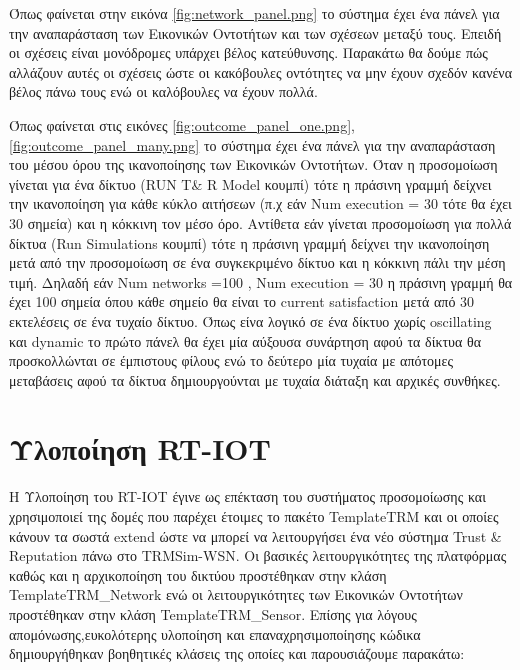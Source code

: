 Όπως φαίνεται στην εικόνα \ref{fig:network_panel.png} το σύστημα έχει ένα πάνελ για την αναπαράσταση των Εικονικών Οντοτήτων και των σχέσεων μεταξύ τους. Επειδή οι σχέσεις είναι μονόδρομες υπάρχει βέλος κατεύθυνσης. Παρακάτω θα δούμε πώς αλλάζουν αυτές οι σχέσεις ώστε οι κακόβουλες οντότητες να μην έχουν σχεδόν κανένα βέλος πάνω τους ενώ οι καλόβουλες να έχουν πολλά.

\newpage
Όπως φαίνεται στις εικόνες \ref{fig:outcome_panel_one.png}, \ref{fig:outcome_panel_many.png} το σύστημα έχει ένα πάνελ για την αναπαράσταση του μέσου όρου της ικανοποίησης των Εικονικών Οντοτήτων. Όταν η προσομοίωση γίνεται για ένα δίκτυο (RUN T\& R Model κουμπί) τότε η πράσινη γραμμή δείχνει την ικανοποίηση για κάθε κύκλο αιτήσεων (π.χ εάν Num execution = 30 τότε θα έχει 30 σημεία) και η κόκκινη τον μέσο όρο. Αντίθετα εάν γίνεται προσομοίωση για πολλά δίκτυα (Run Simulations κουμπί) τότε η πράσινη γραμμή δείχνει την ικανοποίηση μετά από την προσομοίωση σε ένα συγκεκριμένο δίκτυο και η κόκκινη πάλι την μέση τιμή. Δηλαδή εάν Num networks =100 , Num execution = 30 η πράσινη γραμμή θα έχει 100 σημεία όπου κάθε σημείο θα είναι το current satisfaction μετά από 30 εκτελέσεις σε ένα τυχαίο δίκτυο. Όπως είνα λογικό σε ένα δίκτυο χωρίς oscillating και dynamic το πρώτο πάνελ θα έχει μία αύξουσα συνάρτηση αφού τα δίκτυα θα προσκολλώνται σε έμπιστους φίλους ενώ το δεύτερο μία τυχαία με απότομες μεταβάσεις αφού τα δίκτυα δημιουργούνται με τυχαία διάταξη και αρχικές συνθήκες.



\newpage
\section{Υλοποίηση RT-IOT}

Η Υλοποίηση του RT-IOT έγινε ως επέκταση του συστήματος προσομοίωσης και χρησιμοποιεί της δομές που παρέχει έτοιμες  το πακέτο TemplateTRM 
και οι οποίες κάνουν τα σωστά extend ώστε να μπορεί να λειτουργήσει ένα νέο σύστημα Trust \& Reputation πάνω στο TRMSim-WSN.
 Οι βασικές λειτουργικότητες της πλατφόρμας καθώς και η αρχικοποίηση του δικτύου προστέθηκαν στην κλάση TemplateTRM\_Network 
 ενώ οι λειτουργικότητες των Εικονικών Οντοτήτων προστέθηκαν στην κλάση TemplateTRM\_Sensor. 
 Επίσης για λόγους απομόνωσης,ευκολότερης υλοποίηση και επαναχρησιμοποίησης κώδικα δημιουργήθηκαν βοηθητικές κλάσεις της οποίες και παρουσιάζουμε παρακάτω:


